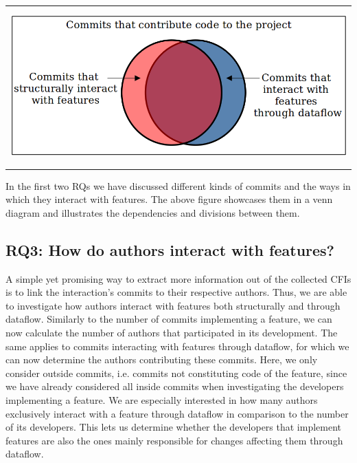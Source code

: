 \begin{center}
\begin{tabular}{c}
\includegraphics[height=6cm]{gfx/Commits-of-a-Software-Project.png}
\end{tabular}
\end{center}
In the first two RQs we have discussed different kinds of commits and the ways in which they interact with features. 
The above figure showcases them in a venn diagram and illustrates the dependencies and divisions between them.

\subsection[RQ3: How do authors interact with features?]{\textbf{RQ3}: How do authors interact with features?}\label{sec:meth:RQ3}

A simple yet promising way to extract more information out of the collected CFIs is to link the interaction's commits to their respective authors.
Thus, we are able to investigate how authors interact with features both structurally and through dataflow.
Similarly to the number of commits implementing a feature, we can now calculate the number of authors that participated in its development.
The same applies to commits interacting with features through dataflow, for which we can now determine the authors contributing these commits.
Here, we only consider outside commits, i.e. commits not constituting code of the feature, since we have already considered all inside commits when investigating the developers implementing a feature.
We are especially interested in how many authors exclusively interact with a feature through dataflow in comparison to the number of its developers.
This lets us determine whether the developers that implement features are also the ones mainly responsible for changes affecting them through dataflow.

